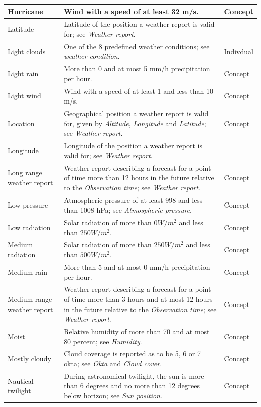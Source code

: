 \begin{longtable}{|p{}|p{}|p{}|}
  Hurricane & Wind with a speed of at least 32 m/s. & Concept \\
  \hline
  Latitude & Latitude of the position a weather report is valid for; see \emph{Weather report}. & \\ %
  \hline
  Light clouds & One of the 8 predefined weather conditions; see \emph{weather condition}. & Indivdual \\
  \hline
  Light rain & More than 0 and at most 5 mm/h precipitation per hour. & Concept \\
  \hline
  Light wind & Wind with a speed of at least 1 and less than 10 m/s. & Concept \\
  \hline
  Location & Geographical position a weather report is valid for, given by \emph{Altitude}, \emph{Longitude} and \emph{Latitude}; see \emph{Weather report}. & Concept \\
  \hline
  Longitude & Longitude of the position a weather report is valid for; see \emph{Weather report}. & \\ %
  \hline
  Long range weather report & Weather report describing a forecast for a point of time more than 12 hours in the future relative to the \emph{Observation time}; see \emph{Weather report}. & Concept \\
  \hline
  Low pressure & Atmospheric pressure of at least 998 and less than 1008 hPa; see \emph{Atmospheric pressure}. & Concept \\
  \hline
  Low radiation & Solar radiation of more than $0 W/m^2$ and less than $250 W/m^2$. & Concept \\
  \hline
  Medium radiation & Solar radiation of more than $250 W/m^2$ and less than $500 W/m^2$. & Concept \\
  \hline
  Medium rain & More than 5 and at most 0 mm/h precipitation per hour. & Concept \\
  \hline
  Medium range weather report & Weather report describing a forecast for a point of time more than 3 hours and at most 12 hours in the future relative to the \emph{Observation time}; see \emph{Weather report}. & Concept \\
  \hline
  Moist & Relative humidity of more than 70 and at most 80 percent; see \emph{Humidity}. & Concept \\
  \hline
  Mostly cloudy & Cloud coverage is reported as to be 5, 6 or 7 okta; see \emph{Okta} and \emph{Cloud cover}. & Concept \\
  \hline
  Nautical twilight & During astronomical twilight, the sun is more than 6 degrees and no more than 12 degrees below horizon; see \emph{Sun position}. & Concept \\

\end{longtable}
